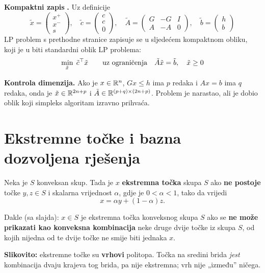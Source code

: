 \textbf{Kompaktni zapis} \textbf{.} Uz definicije
\[
\tilde x = \begin{pmatrix} x^+ \\ x^- \\ s \end{pmatrix}, \quad
\tilde c = \begin{pmatrix} c \\ c \\ 0 \end{pmatrix}, \quad
\tilde A = \begin{pmatrix} G & -G & I \\ A & -A & 0 \end{pmatrix}, \quad
\tilde b = \begin{pmatrix} h \\ b \end{pmatrix}
\]
LP problem s prethodne stranice zapisuje se u sljedećem kompaktnom obliku, koji
je u biti standardni oblik LP problema:
\[
\min_{\tilde x} \; \tilde c^{\top}\tilde x
\qquad\text{uz ograničenja}\quad \tilde A\tilde x = \tilde b, \quad
\tilde x \ge 0
\]

\textbf{Kontrola dimenzija.} Ako je $x \in \mathbb{R}^n$, $Gx \le h$ ima $p$ redaka i
$Ax = b$ ima $q$ redaka, onda je $\tilde x \in \mathbb{R}^{2n+p}$ i
$\tilde A \in \mathbb{R}^{(p+q)\times(2n+p)}$. Problem je narastao, ali je dobio oblik
koji simpleks algoritam izravno prihvaća.

\section{Ekstremne točke i bazna dozvoljena rješenja}

\begin{definicija}
Neka je $S$ konveksan skup. Tada je $x$ \textbf{ekstremna točka} skupa $S$ ako
\textbf{ne postoje} točke $y, z \in S$ i skalarna vrijednost $\alpha$, gdje je
$0 < \alpha < 1$, tako da vrijedi
\[
x = \alpha y + (1-\alpha)z.
\]
\end{definicija}

Dakle (sa slajda): $x \in S$ je ekstremna točka konveksnog skupa $S$ ako se
\textbf{ne može prikazati kao konveksna kombinacija} neke druge dvije točke iz
skupa $S$, od kojih nijedna od te dvije točke ne smije biti jednaka $x$.

\textbf{Slikovito:} ekstremne točke su \textbf{vrhovi} politopa. Točka na
sredini brida \emph{jest} kombinacija dvaju krajeva tog brida, pa nije
ekstremna; vrh nije „između” ničega.

